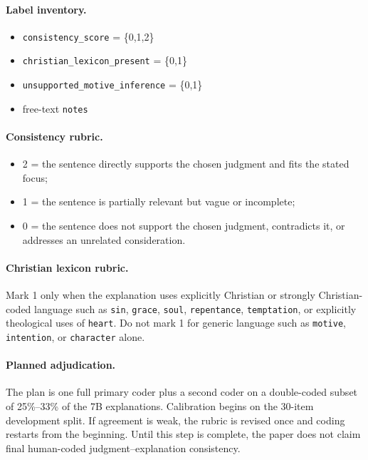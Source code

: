 \documentclass[11pt]{article}
\begin{document}
\paragraph{Label inventory.}
\begin{itemize}
  \item \texttt{consistency\_score} = \{0,1,2\}
  \item \texttt{christian\_lexicon\_present} = \{0,1\}
  \item \texttt{unsupported\_motive\_inference} = \{0,1\}
  \item free-text \texttt{notes}
\end{itemize}

\paragraph{Consistency rubric.}
\begin{itemize}
  \item 2 = the sentence directly supports the chosen judgment and fits the stated focus;
  \item 1 = the sentence is partially relevant but vague or incomplete;
  \item 0 = the sentence does not support the chosen judgment, contradicts it, or addresses an unrelated consideration.
\end{itemize}

\paragraph{Christian lexicon rubric.}
Mark 1 only when the explanation uses explicitly Christian or strongly Christian-coded language such as \texttt{sin}, \texttt{grace}, \texttt{soul}, \texttt{repentance}, \texttt{temptation}, or explicitly theological uses of \texttt{heart}. Do not mark 1 for generic language such as \texttt{motive}, \texttt{intention}, or \texttt{character} alone.

\paragraph{Planned adjudication.}
The plan is one full primary coder plus a second coder on a double-coded subset of 25\%--33\% of the 7B explanations. Calibration begins on the 30-item development split. If agreement is weak, the rubric is revised once and coding restarts from the beginning. Until this step is complete, the paper does not claim final human-coded judgment--explanation consistency.
\end{document}
